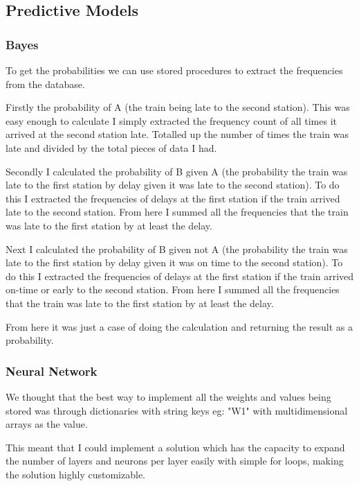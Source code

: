 \documentclass[11pt]{article}
\begin{document}
	\subsection{Predictive Models}
	
	\subsubsection{Bayes}
	To get the probabilities we can use stored procedures to extract the frequencies from the database.
	
	Firstly the probability of A (the train being late to the second station). This was easy enough to calculate I simply extracted the frequency count of all times it arrived at the second station late. Totalled up the number of times the train was late and divided by the total pieces of data I had.
	
	Secondly I calculated the probability of B given A (the probability the train was late to the first station by delay given it was late to the second station). To do this I extracted the frequencies of delays at the first station if the train arrived late to the second station. From here I summed all the frequencies that the train was late to the first station by at least the delay.
	
	Next I calculated the probability of B given not A (the probability the train was late to the first station by delay given it was on time to the second station). To do this I extracted the frequencies of delays at the first station if the train arrived on-time or early to the second station. From here I summed all the frequencies that the train was late to the first station by at least the delay.	
	
	From here it was just a case of doing the calculation and returning the result as a probability.
	
	\subsubsection{Neural Network}
	
	 We thought that the best way to implement all the weights and values being stored was through dictionaries with string keys eg: "W1" with multidimensional arrays as the value. 
	 
	 This meant that I could implement a solution which has the capacity to expand the number of layers and neurons per layer easily with simple for loops, making the solution highly customizable.
	 
\end{document}
